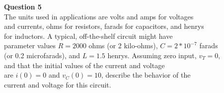 \documentclass[preview]{standalone}
\begin{document}
\begin{center}
\raggedright
                    \textbf{Question 5}\\
                    The units used in applications are volts and amps for voltages \\ 
                    and currents, ohms for resistors, farads for capacitors, and henrys \\
                    for inductors. A typical, off-the-shelf circuit might have \\
                    parameter values $R = 2000$ ohms (or 2 kilo-ohms), $C = 2 * 10^{-7}$  farads \\
                     (or 0.2 microfarads), and $L = 1.5$ henrys. Assuming zero input, $v_T = 0$, \\
                    and that the initial values of the current and voltage \\
                    are $i(0) = 0$ and $v_C(0) = 10$, describe the behavior of the \\
                    current and voltage for this circuit.
\end{center}
\end{document}
